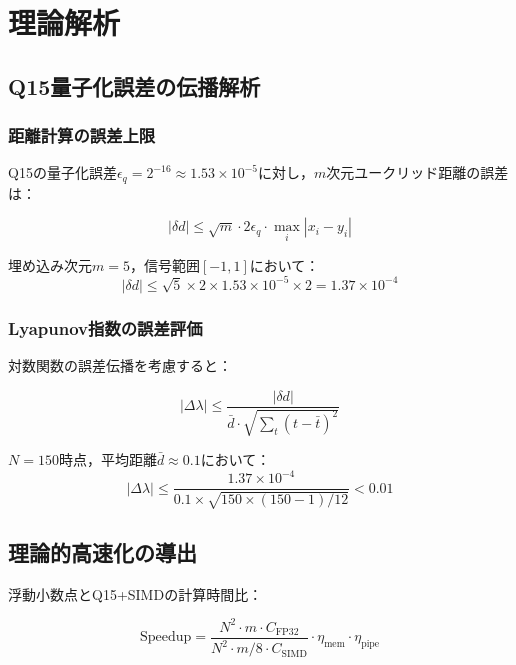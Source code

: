 \documentclass[paper]{ieice}
\begin{document}
\section{理論解析}

\subsection{Q15量子化誤差の伝播解析}

\subsubsection{距離計算の誤差上限}
Q15の量子化誤差$\epsilon_q = 2^{-16} \approx 1.53 \times 10^{-5}$に対し，$m$次元ユークリッド距離の誤差は：

\begin{equation}
|\delta d| \leq \sqrt{m} \cdot 2\epsilon_q \cdot \max_i |x_i - y_i|
\end{equation}

埋め込み次元$m=5$，信号範囲$[-1,1]$において：
\begin{equation}
|\delta d| \leq \sqrt{5} \times 2 \times 1.53 \times 10^{-5} \times 2 = 1.37 \times 10^{-4}
\end{equation}

\subsubsection{Lyapunov指数の誤差評価}
対数関数の誤差伝播を考慮すると：

\begin{equation}
|\Delta\lambda| \leq \frac{|\delta d|}{\bar{d} \cdot \sqrt{\sum_{t}(t - \bar{t})^2}}
\end{equation}

$N=150$時点，平均距離$\bar{d} \approx 0.1$において：
\begin{equation}
|\Delta\lambda| \leq \frac{1.37 \times 10^{-4}}{0.1 \times \sqrt{150 \times (150-1)/12}} < 0.01
\end{equation}

\subsection{理論的高速化の導出}

浮動小数点とQ15+SIMDの計算時間比：

\begin{equation}
\text{Speedup} = \frac{N^2 \cdot m \cdot C_{\text{FP32}}}{N^2 \cdot m/8 \cdot C_{\text{SIMD}}} \cdot \eta_{\text{mem}} \cdot \eta_{\text{pipe}}
\end{equation}
\end{document}
